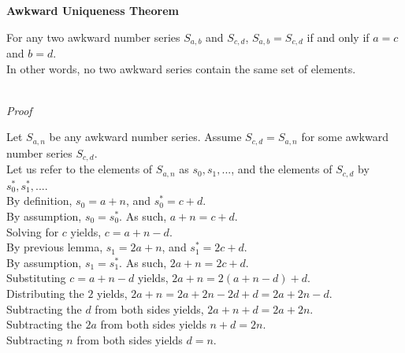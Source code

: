 \documentclass[a4paper,12pt]{article}
\begin{document}
\label{theorem:awkward_uniqueness}
\hypertarget{theorem:awkward_uniqueness}{}
\begin{tcolorbox}
\textbf{Awkward Uniqueness Theorem}

\noindent For any two awkward number series $S_{a,b}$ and $S_{c,d}$, $S_{a,b} = S_{c,d}$ if and only if $a = c$ and $b = d$.\\

\noindent In other words, no two awkward series contain the same set of elements.
\end{tcolorbox}

\noindent \\
\textit{Proof}

\noindent Let $S_{a,n}$ be any awkward number series. Assume $S_{c, d} = S_{a, n}$ for some awkward number series $S_{c,d}$.\\


\noindent Let us refer to the elements of $S_{a,n}$ as $s_0, s_1, ...$, and the elements of $S_{c,d}$ by $s^*_0, s^*_1, ...$.\\

\noindent By definition, $s_0 = a + n$, and $s^*_0 = c + d$.\\

\noindent By assumption, $s_0 = s^*_0$. As such, $a + n = c + d$.\\

\noindent Solving for $c$ yields, $c = a + n - d$.\\

\noindent By previous lemma, $s_1 = 2a + n$, and $s^*_1 = 2c + d$.\\

\noindent By assumption, $s_1 = s^*_1$. As such, $2a + n = 2c + d$.\\

\noindent Substituting $c = a + n - d$ yields, $2a + n = 2(a + n - d) + d$.\\

\noindent Distributing the $2$ yields, $2a + n = 2a + 2n - 2d + d = 2a + 2n - d$.\\

\noindent Subtracting the $d$ from both sides yields, $2a + n + d = 2a + 2n$.\\

\noindent Subtracting the $2a$ from both sides yields $n + d = 2n$.\\

\noindent Subtracting $n$ from both sides yields $d = n$.\\
\end{document}
